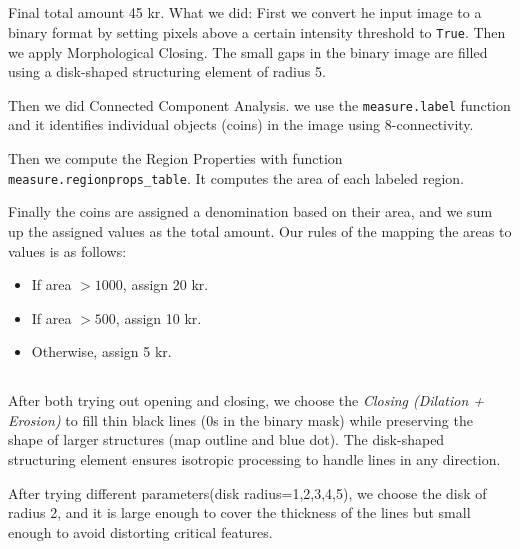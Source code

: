 \documentclass[12pt]{article}
\begin{document}
\subsection{} %

Final total amount 45 kr. What we did: First we convert he input image to a binary format by setting pixels above a certain intensity threshold to \texttt{True}. 
Then we apply Morphological Closing. The small gaps in the binary image are filled using a disk-shaped structuring element of radius 5.

Then we did Connected Component Analysis. we use the \texttt{measure.label} function and it identifies individual objects (coins) in the image using 8-connectivity.

Then we compute the Region Properties with function \texttt{measure.regionprops\_table}. It computes the area of each labeled region.

Finally the coins are assigned a denomination based on their area, and we sum up the assigned values as the total amount. Our rules of the mapping the areas to values is as follows:
    \begin{itemize}
        \item If area $> 1000$, assign 20 kr.
        \item If area $> 500$, assign 10 kr.
        \item Otherwise, assign 5 kr.
    \end{itemize}

\subsection{} %

After both trying out opening and closing, we choose the \textit{Closing (Dilation + Erosion)} to fill thin black lines (0s in the binary mask) while preserving the shape of larger structures (map outline and blue dot). The disk-shaped structuring element ensures isotropic processing to handle lines in any direction.

After trying different parameters(disk radius=1,2,3,4,5), we choose the disk of radius 2, and it is large enough to cover the thickness of the lines but small enough to avoid distorting critical features.
\end{document}
